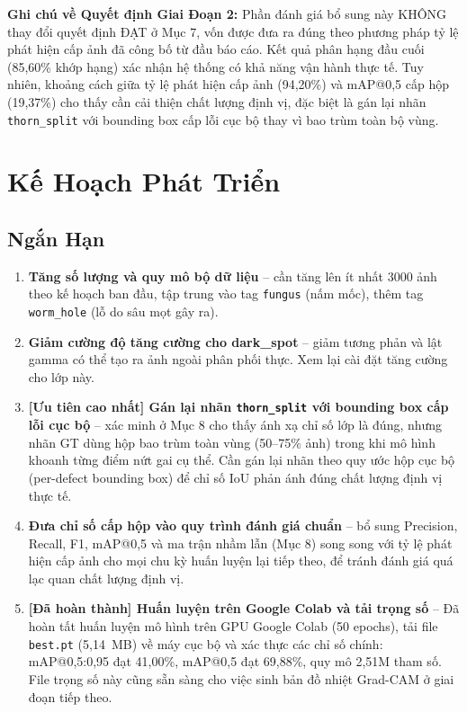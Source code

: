 \documentclass[12pt, a4paper]{article}
\begin{document}
\begin{tcolorbox}[kpibox]
\textbf{Ghi chú về Quyết định Giai Đoạn 2:} Phần đánh giá bổ sung này KHÔNG thay đổi quyết định ĐẠT ở Mục 7, vốn được đưa ra đúng theo phương pháp tỷ lệ phát hiện cấp ảnh đã công bố từ đầu báo cáo. Kết quả phân hạng đầu cuối (85,60\% khớp hạng) xác nhận hệ thống có khả năng vận hành thực tế. Tuy nhiên, khoảng cách giữa tỷ lệ phát hiện cấp ảnh (94,20\%) và mAP@0,5 cấp hộp (19,37\%) cho thấy cần cải thiện chất lượng định vị, đặc biệt là gán lại nhãn \texttt{thorn\_split} với bounding box cấp lỗi cục bộ thay vì bao trùm toàn bộ vùng.
\end{tcolorbox}

\section{Kế Hoạch Phát Triển}

\subsection{Ngắn Hạn}

\begin{enumerate}[leftmargin=1.5em]
  \item \textbf{Tăng số lượng và quy mô bộ dữ liệu} -- cần tăng lên ít nhất 3000 ảnh theo kế hoạch ban đầu, tập trung vào tag \texttt{fungus} (nấm mốc), thêm tag \texttt{worm\_hole} (lỗ do sâu mọt gây ra).
  \item \textbf{Giảm cường độ tăng cường cho dark\_spot} -- giảm tương phản và lật gamma có thể tạo ra ảnh ngoài phân phối thực. Xem lại cài đặt tăng cường cho lớp này.
  \item \textbf{[Ưu tiên cao nhất] Gán lại nhãn \texttt{thorn\_split} với bounding box cấp lỗi cục bộ} -- xác minh ở Mục 8 cho thấy ánh xạ chỉ số lớp là đúng, nhưng nhãn GT dùng hộp bao trùm toàn vùng (50--75\% ảnh) trong khi mô hình khoanh từng điểm nứt gai cụ thể. Cần gán lại nhãn theo quy ước hộp cục bộ (per-defect bounding box) để chỉ số IoU phản ánh đúng chất lượng định vị thực tế.
  \item \textbf{Đưa chỉ số cấp hộp vào quy trình đánh giá chuẩn} -- bổ sung Precision, Recall, F1, mAP@0,5 và ma trận nhầm lẫn (Mục 8) song song với tỷ lệ phát hiện cấp ảnh cho mọi chu kỳ huấn luyện lại tiếp theo, để tránh đánh giá quá lạc quan chất lượng định vị.
  \item \textbf{[Đã hoàn thành] Huấn luyện trên Google Colab và tải trọng số} -- Đã hoàn tất huấn luyện mô hình trên GPU Google Colab (50 epochs), tải file \texttt{best.pt} (5,14~MB) về máy cục bộ và xác thực các chỉ số chính: mAP@0,5:0,95 đạt 41,00\%, mAP@0,5 đạt 69,88\%, quy mô 2,51M tham số. File trọng số này cũng sẵn sàng cho việc sinh bản đồ nhiệt Grad-CAM ở giai đoạn tiếp theo.
\end{enumerate}
\end{document}
